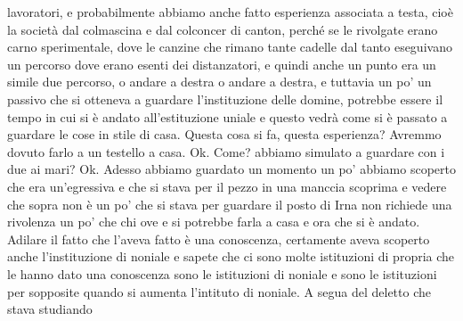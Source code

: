 {lavoratori, e probabilmente abbiamo anche fatto esperienza associata a testa, cioè la società dal colmascina e dal colconcer di canton, perché se le rivolgate erano carno sperimentale, dove le canzine che rimano tante cadelle dal tanto eseguivano un percorso dove erano esenti dei distanzatori, e quindi anche un punto era un simile due percorso, o andare a destra o andare a destra, e tuttavia un po' un passivo che si otteneva a guardare l'instituzione delle domine, potrebbe essere il tempo in cui si è andato all'estituzione uniale e questo vedrà come si è passato a guardare le cose in stile di casa. Questa cosa si fa, questa esperienza? Avremmo dovuto farlo a un testello a casa. Ok. Come? abbiamo simulato a guardare con i due ai mari? Ok. Adesso abbiamo guardato un momento un po' abbiamo scoperto che era un'egressiva e che si stava per il pezzo in una manccia scoprima e vedere che sopra non è un po' che si stava per guardare il posto di Irna non richiede una rivolenza un po' che chi ove e si potrebbe farla a casa e ora che si è andato. Adilare il fatto che l'aveva fatto è una conoscenza, certamente aveva scoperto anche l'instituzione di noniale e sapete che ci sono molte istituzioni di propria che le hanno dato una conoscenza sono le istituzioni di noniale e sono le istituzioni per sopposite quando si aumenta l'intituto di noniale. A segua del deletto che stava studiando 

}
